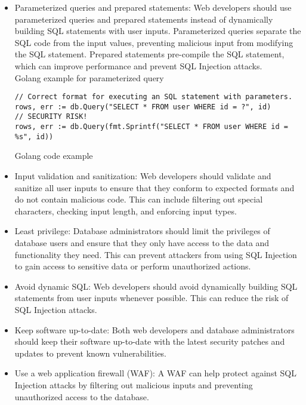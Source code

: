 \documentclass[11pt]{article}
\begin{document}
\begin{itemize}
\item Parameterized queries and prepared statements: Web developers should use parameterized queries and prepared statements instead of dynamically building SQL statements with user inputs. Parameterized queries separate the SQL code from the input values, preventing malicious input from modifying the SQL statement. Prepared statements pre-compile the SQL statement, which can improve performance and prevent SQL Injection attacks.\\

Golang example for parameterized query\\
\begin{listing}[htbp]
\begin{verbatim}
// Correct format for executing an SQL statement with parameters.
rows, err := db.Query("SELECT * FROM user WHERE id = ?", id)
// SECURITY RISK!
rows, err := db.Query(fmt.Sprintf("SELECT * FROM user WHERE id = %s", id))
\end{verbatim}
\caption{Golang code example}
\end{listing}

\item Input validation and sanitization: Web developers should validate and sanitize all user inputs to ensure that they conform to expected formats and do not contain malicious code. This can include filtering out special characters, checking input length, and enforcing input types.\\

\item Least privilege: Database administrators should limit the privileges of database users and ensure that they only have access to the data and functionality they need. This can prevent attackers from using SQL Injection to gain access to sensitive data or perform unauthorized actions.\\

\item Avoid dynamic SQL: Web developers should avoid dynamically building SQL statements from user inputs whenever possible. This can reduce the risk of SQL Injection attacks.\\

\item Keep software up-to-date: Both web developers and database administrators should keep their software up-to-date with the latest security patches and updates to prevent known vulnerabilities.\\

\item Use a web application firewall (WAF): A WAF can help protect against SQL Injection attacks by filtering out malicious inputs and preventing unauthorized access to the database.\\
\end{itemize}
\end{document}
